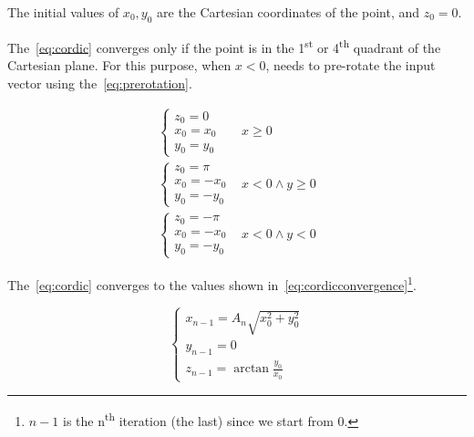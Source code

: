The initial values of \(x_0, y_0\) are the Cartesian coordinates of the
point, and \(z_0 = 0\).

The~\eqref{eq:cordic} converges only if the point is in the
1\textsuperscript{st} or 4\textsuperscript{th} quadrant of the Cartesian plane.
For this purpose, when \(x < 0\), \cordic{} needs to pre-rotate the input vector
using the~\eqref{eq:prerotation}.

\begin{equation}\label{eq:prerotation}
	\begin{array}{ll}
		\begin{cases}
			z_0 = 0\\
			x_0 = x_0\\
			y_0 = y_0
		\end{cases} & x \ge 0\\
		\begin{cases}
			z_0 = \pi\\
			x_0 = -x_0\\
			y_0 = -y_0
		\end{cases} & x < 0 \land y \ge 0\\
		\begin{cases}
			z_0 = -\pi\\
			x_0 = -x_0\\
			y_0 = -y_0
		\end{cases} & x < 0 \land y < 0
	\end{array}
\end{equation}

The~\eqref{eq:cordic} converges to the values shown
in~\eqref{eq:cordicconvergence}\footnote{\(n-1\) is the n\textsuperscript{th}
iteration (the last) since we start from \(0\).}.

\begin{equation}\label{eq:cordicconvergence}
	\begin{cases}
		x_{n-1} = A_n \sqrt{x_0^2 + y_0^2}\\
		y_{n-1} = 0\\
		z_{n-1} = \arctan\frac{y_0}{x_0}
	\end{cases}
\end{equation}
